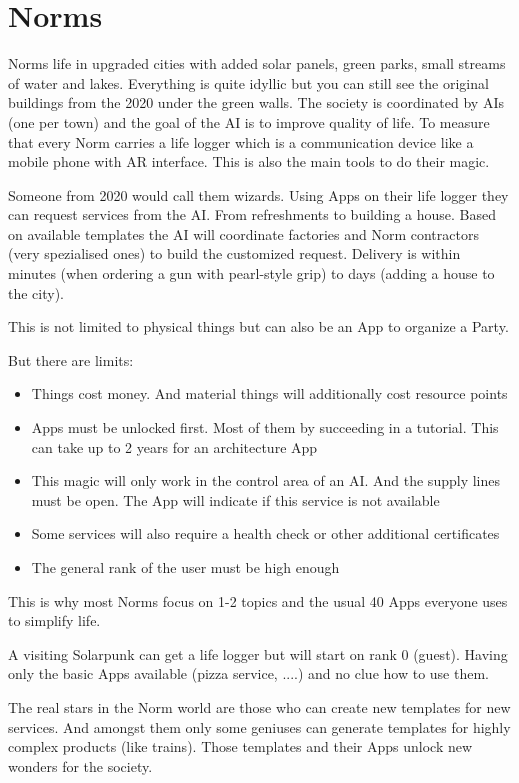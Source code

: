 \section{Norms}

Norms life in upgraded cities with added solar panels, green parks, small streams of water and lakes. Everything is quite idyllic but you can still see the original buildings from the 2020 under the green walls.
The society is coordinated by AIs (one per town) and the goal of the AI is to improve quality of life.
To measure that every Norm carries a life logger which is a communication device like a mobile phone with AR interface. This is also the main tools to do their magic.

Someone from 2020 would call them wizards. Using Apps on their life logger they can request services from the AI. From refreshments to building a house. Based on available templates the AI will coordinate factories and Norm contractors (very spezialised ones) to build the customized request.
Delivery is within minutes (when ordering a gun with pearl-style grip) to days (adding a house to the city).

This is not limited to physical things but can also be an App to organize a Party.

But there are limits:

\begin{itemize}
    \item Things cost money. And material things will additionally cost resource points
    \item Apps must be unlocked first. Most of them by succeeding in a tutorial. This can take up to 2 years for an architecture App
    \item This magic will only work in the control area of an AI. And the supply lines must be open. The App will indicate if this service is not available
    \item Some services will also require a health check or other additional certificates
    \item The general rank of the user must be high enough
\end{itemize}

This is why most Norms focus on 1-2 topics and the usual 40 Apps everyone uses to simplify life.

A visiting Solarpunk can get a life logger but will start on rank 0 (guest). Having only the basic Apps available (pizza service, ....) and no clue how to use them.

The real stars in the Norm world are those who can create new templates for new services. And amongst them only some geniuses can generate templates for highly complex products (like trains).
Those templates and their Apps unlock new wonders for the society.

